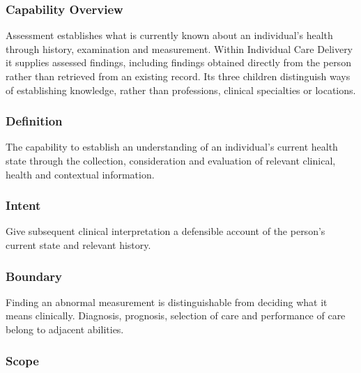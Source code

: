 \subsubsection*{Capability Overview}

Assessment establishes what is currently known about an individual's health through history, examination and measurement. Within Individual Care Delivery it supplies assessed findings, including findings obtained directly from the person rather than retrieved from an existing record. Its three children distinguish ways of establishing knowledge, rather than professions, clinical specialties or locations.

\subsubsection*{Definition}

The capability to establish an understanding of an individual's current health state through the collection, consideration and evaluation of relevant clinical, health and contextual information.

\subsubsection*{Intent}

Give subsequent clinical interpretation a defensible account of the person's current state and relevant history.

\subsubsection*{Boundary}

Finding an abnormal measurement is distinguishable from deciding what it means clinically. Diagnosis, prognosis, selection of care and performance of care belong to adjacent abilities.

\subsubsection*{Scope}
